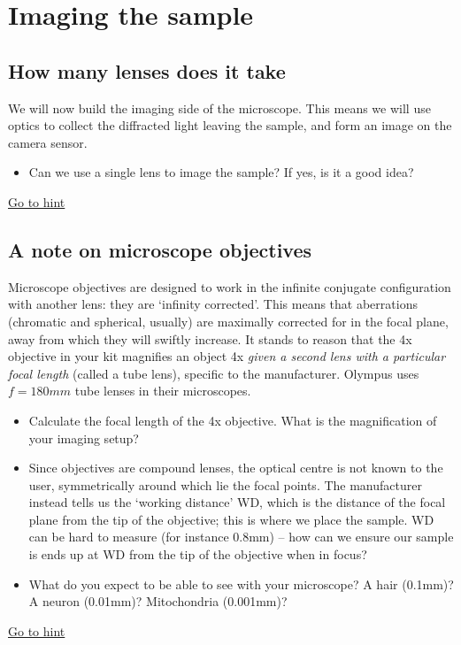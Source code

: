 \documentclass[a4paper]{report}
\begin{document}
\section{Imaging the sample}
\hypertarget{hintBack-imaging}{}
\subsection{How many lenses does it take}
We will now build the imaging side of the microscope.
This means we will use optics to collect the diffracted light leaving the sample, and form an image on the camera sensor.
\begin{itemize}
    \item Can we use a single lens to image the sample? If yes, is it a good idea?
\end{itemize}
   \noindent
\hyperlink{hintTo-imaging}{Go to hint}
\subsection{A note on microscope objectives}
Microscope objectives are designed to work in the infinite conjugate configuration with another lens: they are `infinity corrected'.
This means that aberrations (chromatic and spherical, usually) are maximally corrected for in the focal plane, away from which they will swiftly increase.
It stands to reason that the 4x objective in your kit magnifies an object 4x \emph{given a second lens with a particular focal length} (called a tube lens), specific to the manufacturer. Olympus uses $f=180mm$ tube lenses in their microscopes.
\begin{itemize}
    \item Calculate the focal length of the 4x objective. What is the magnification of your imaging setup?
    \item Since objectives are compound lenses, the optical centre is not known to the user, symmetrically around which lie the focal points. The manufacturer instead tells us the `working distance' WD, which is the distance of the focal plane from the tip of the objective; this is where we place the sample. WD can be hard to measure (for instance 0.8mm) -- how can we ensure our sample is ends up at WD from the tip of the objective when in focus?
    \item What do you expect to be able to see with your microscope? A hair (0.1mm)? A neuron (0.01mm)? Mitochondria (0.001mm)?
\end{itemize}
   \noindent
\hyperlink{hintTo-imaging}{Go to hint}
\end{document}
